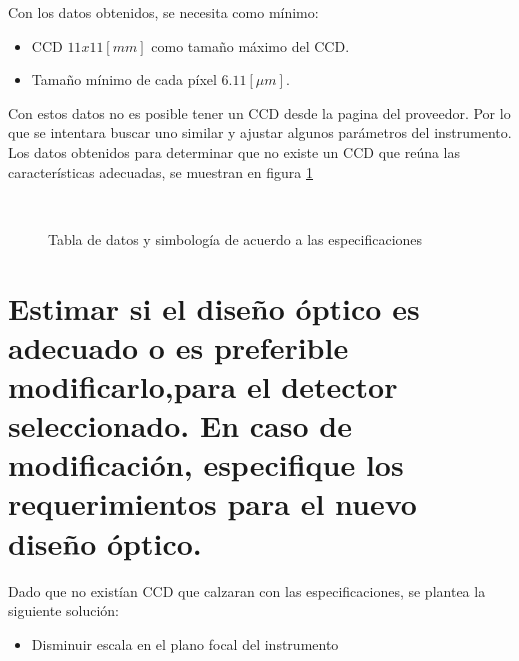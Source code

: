 \documentclass[a4paper,10pt]{article}
\begin{document}
Con los datos obtenidos, se necesita como mínimo:
\begin{itemize}
\item CCD $11x11[mm]$ como tamaño máximo del CCD.
\item Tamaño mínimo de cada píxel $6.11 [\mu m]$.
\end{itemize}

Con estos datos no es posible tener un CCD desde la pagina del proveedor. Por
lo que se intentara buscar uno similar y ajustar algunos parámetros del
instrumento.
Los datos obtenidos para determinar que no existe un CCD que reúna las características adecuadas, se muestran en figura \ref{fig:p1} 
\begin{figure}[ht!]
  \centering
  ~ 
  ~ 
  \caption{Tabla de datos y simbología de acuerdo a las especificaciones}
  \label{fig:p1}
\end{figure}



\section{Estimar si el diseño óptico es adecuado o es preferible
modificarlo,para el detector seleccionado. En caso de modificación, especifique
los requerimientos para el nuevo diseño óptico.} 

Dado que no existían CCD que
calzaran con las especificaciones, se plantea la siguiente solución:
\begin{itemize}
\item Disminuir escala en el plano focal del instrumento
\end{itemize}
\end{document}
